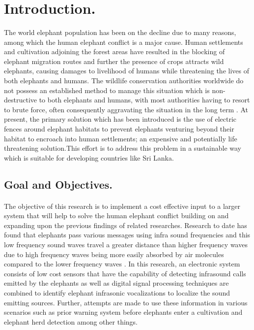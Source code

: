 \documentclass[12pt]{article}
\numberwithin{figure}{section}
\numberwithin{table}{section}
\begin{document}
\newpage
{}
\newpage
\section{Introduction.}
\paragraph{}
The world elephant population has been on the decline \cite {13} due to many reasons, among which the human elephant conflict is a major cause. Human settlements and cultivation adjoining the forest areas have resulted in the blocking of elephant migration routes and further  the presence of crops attracts wild elephants, causing damages to livelihood of humans while threatening the lives of both elephants and humans. The wildlife conservation authorities worldwide do not possess an established method to manage this situation which is non-destructive to both elephants and humans, with most authorities having to resort to brute force, often consequently aggravating the situation in the long term \cite {13}. At present, the primary solution which has been introduced is the use of electric fences around elephant habitats to prevent elephants venturing beyond their habitat to encroach into human settlements; an expensive and potentially life threatening solution.This effort is to address this problem in a sustainable way which is suitable for developing countries like Sri Lanka.
\subsection{Goal and Objectives.}
\paragraph{}
The objective of this research is to implement a cost effective input to a larger system that will help to solve the human elephant conflict building on and expanding upon the previous findings of related researches. Research to date has found that elephants pass various messages using infra sound frequencies and this low frequency sound waves travel a greater distance than higher frequency waves  due to high frequency waves being more easily absorbed by air molecules compared to the lower frequency waves \cite {5}. In this research, an electronic system consists of low cost sensors that have the capability of detecting infrasound calls emitted by the elephants as well as digital signal processing techniques are combined to  identify elephant  infrasonic vocalizations to localize the sound emitting sources. Further, attempts are made to use these information in various scenarios such as prior warning system before elephants enter a cultivation and elephant herd detection among other things.
\end{document}
